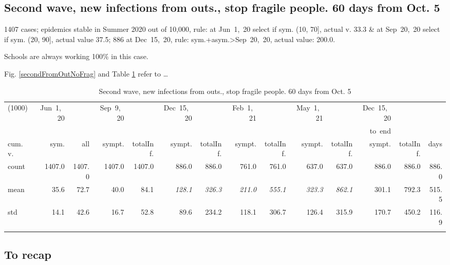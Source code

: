 \documentclass[graybox]{svmult}
\begin{document}
\subsection{Second wave, new infections from outs., stop fragile people. 60 days from Oct. 5}
\label{frag}

1407 cases; epidemics stable in Summer 2020 out of 10,000, rule: at Jun~1,~20 select if sym. (10, 70], actual v. 33.3 \& at Sep~20,~20 select if sym. (20, 90], actual value 37.5; 886 at Dec~15,~20, rule: sym.+asym.>Sep~20,~20, actual value: 200.0.

Schools are always working 100\% in this case.

Fig. \ref{secondFromOutNoFrag} and Table \ref{selForceWave2NoFragTab} refer to \ldots

\begin{table}[t]
\center
\tiny
\begin{tabular}{lrrrrrrrrrrrrr}
\hline\noalign{\smallskip}
(1000) & Jun~1,~20 & & Sep~9,~20 & & Dec~15,~20 & & Feb~1,~21 & & May~1,~21 & & Dec~15,~20 \\
& & & & & & & & & & & to~end \\
cum.~v. & sym. & all & sympt. & totalInf. & sympt. & totalInf. & sympt. & totalInf. & sympt. & totalInf. & sympt. & totalInf. & days\\
\noalign{\smallskip}\svhline\noalign{\smallskip}
count & 1407.0 & 1407.0 & 1407.0 & 1407.0 & 886.0 & 886.0 & 761.0 & 761.0 & 637.0 & 637.0 & 886.0 & 886.0 & 886.0 \\
mean & 35.6 & 72.7 & 40.0 & 84.1 & \emph{{\color{cyan}128.1}} & \emph{{\color{cyan}326.3}} & \emph{211.0} & \emph{555.1} & \emph{323.3} & \emph{862.1} & 301.1 & 792.3 & 515.5 \\
std & 14.1 & 42.6 & 16.7 & 52.8 & 89.6 & 234.2 & 118.1 & 306.7 & 126.4 & 315.9 & 170.7 & 450.2 & 116.9 \\
\hline\noalign{\smallskip}
\end{tabular}
\caption{Second wave, new infections from outs., stop fragile people. 60 days from Oct. 5}
\label{selForceWave2NoFragTab}
\end{table}


\subsection{To recap}
\label{recap}
\end{document}
